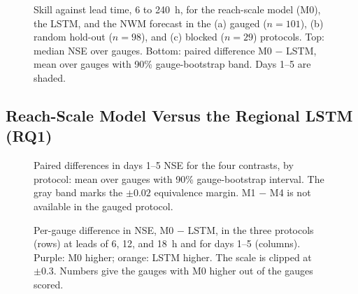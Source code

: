 \begin{figure}
\caption{Skill against lead time, 6 to 240~h, for the reach-scale model (M0), the LSTM, and the NWM forecast in the (a) gauged ($n = 101$), (b) random hold-out ($n = 98$), and (c) blocked ($n = 29$) protocols. Top: median NSE over gauges. Bottom: paired difference M0 $-$ LSTM, mean over gauges with 90\% gauge-bootstrap band. Days 1--5 are shaded.}
\label{fig:skill}
\end{figure}



\subsection{Reach-Scale Model Versus the Regional LSTM (RQ1)}
\label{sec:res-rq1}

\begin{figure}
\caption{Paired differences in days 1--5 NSE for the four contrasts, by protocol: mean over gauges with 90\% gauge-bootstrap interval. The gray band marks the $\pm 0.02$ equivalence margin. M1 $-$ M4 is not available in the gauged protocol.}
\label{fig:contrasts}
\end{figure}

\begin{figure}
\caption{Per-gauge difference in NSE, M0 $-$ LSTM, in the three protocols (rows) at leads of 6, 12, and 18~h and for days 1--5 (columns). Purple: M0 higher; orange: LSTM higher. The scale is clipped at $\pm 0.3$. Numbers give the gauges with M0 higher out of the gauges scored.}
\label{fig:maps-protocol}
\end{figure}

